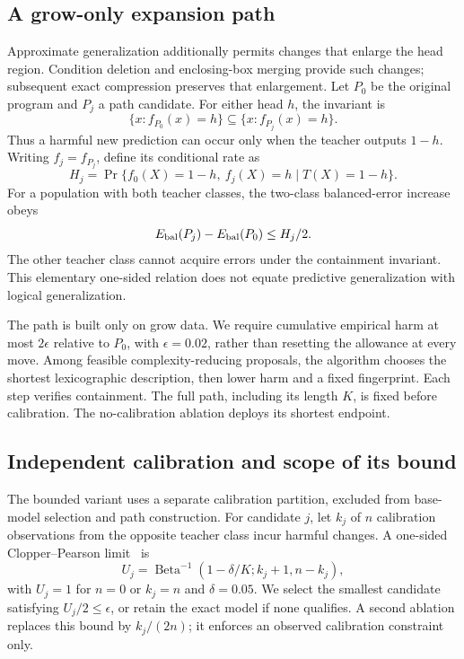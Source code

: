 \subsection{A grow-only expansion path}
Approximate generalization additionally permits changes that enlarge the head region. Condition deletion and enclosing-box merging provide such changes; subsequent exact compression preserves that enlargement. Let $P_0$ be the original program and $P_j$ a path candidate. For either head $h$, the invariant is
\begin{equation}
 \{x:f_{P_0}(x)=h\}\subseteq\{x:f_{P_j}(x)=h\}.
\end{equation}
Thus a harmful new prediction can occur only when the teacher outputs $1-h$. Writing $f_j=f_{P_j}$, define its conditional rate as
\begin{equation}
 H_j=\Pr\{f_0(X)=1-h,\ f_j(X)=h\mid T(X)=1-h\}.
\end{equation}
For a population with both teacher classes, the two-class balanced-error increase obeys
\begin{equation}\label{eq:generalization-harm}
 E_{\rm bal}(P_j)-E_{\rm bal}(P_0)\leq H_j/2.
\end{equation}
The other teacher class cannot acquire errors under the containment invariant. This elementary one-sided relation does not equate predictive generalization with logical generalization.

The path is built only on grow data. We require cumulative empirical harm at most $2\epsilon$ relative to $P_0$, with $\epsilon=0.02$, rather than resetting the allowance at every move. Among feasible complexity-reducing proposals, the algorithm chooses the shortest lexicographic description, then lower harm and a fixed fingerprint. Each step verifies containment. The full path, including its length $K$, is fixed before calibration. The no-calibration ablation deploys its shortest endpoint.

\subsection{Independent calibration and scope of its bound}
The bounded variant uses a separate calibration partition, excluded from base-model selection and path construction. For candidate $j$, let $k_j$ of $n$ calibration observations from the opposite teacher class incur harmful changes. A one-sided Clopper--Pearson limit~\citep{clopper1934} is
\begin{equation}
 U_j=\operatorname{Beta}^{-1}(1-\delta/K;k_j+1,n-k_j),
\end{equation}
with $U_j=1$ for $n=0$ or $k_j=n$ and $\delta=0.05$. We select the smallest candidate satisfying $U_j/2\leq\epsilon$, or retain the exact model if none qualifies. A second ablation replaces this bound by $k_j/(2n)$; it enforces an observed calibration constraint only.

